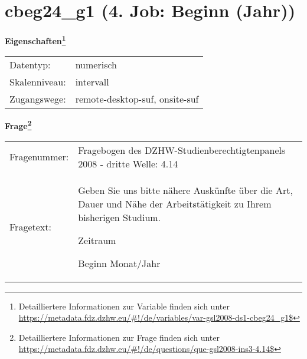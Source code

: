 
    \setcounter{footnote}{0}

    \vspace*{-1.8cm}
	\section{cbeg24\_g1 (4. Job: Beginn (Jahr))}
	\label{section:cbeg24_g1}



    \vspace*{0.5cm}
    \noindent\textbf{Eigenschaften\footnote{Detailliertere Informationen zur Variable finden sich unter
		\url{https://metadata.fdz.dzhw.eu/\#!/de/variables/var-gsl2008-ds1-cbeg24_g1$}}}\\
	\begin{tabularx}{\hsize}{@{}lX}
	Datentyp: & numerisch \\
	Skalenniveau: & intervall \\
	Zugangswege: &
	  remote-desktop-suf, 
	  onsite-suf
 \\
    \end{tabularx}



				\vspace*{0.5cm}
                \noindent\textbf{Frage\footnote{Detailliertere Informationen zur Frage finden sich unter
		              \url{https://metadata.fdz.dzhw.eu/\#!/de/questions/que-gsl2008-ins3-4.14$}}}\\
				\begin{tabularx}{\hsize}{@{}lX}
					Fragenummer: &
					  Fragebogen des DZHW-Studienberechtigtenpanels 2008 - dritte Welle:
					  4.14
 \\
					Fragetext: & Geben Sie uns bitte nähere Auskünfte über die Art, Dauer und Nähe der Arbeitstätigkeit zu Ihrem bisherigen Studium.\par  Zeitraum\par  Beginn Monat/Jahr \\
				\end{tabularx}





